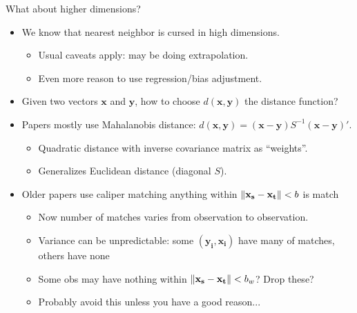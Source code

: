 \documentclass[xcolor=pdftex,dvipsnames,table,mathserif,aspectratio=169]{beamer}
\DeclarePairedDelimiter\norm{\lVert}{\rVert}%
\begin{document}
\begin{frame}{What about higher dimensions?}
\begin{itemize}
\item We know that nearest neighbor is \alert{cursed} in high dimensions.
\begin{itemize}
\item Usual caveats apply: may be doing \alert{extrapolation}.
\item Even more reason to use regression/bias adjustment.
\end{itemize}
\item Given two vectors $\mathbf{x}$ and $\mathbf{y}$, how to choose $d(\mathbf{x},\mathbf{y})$ the \alert{distance} function?
\item Papers mostly use \alert{Mahalanobis distance}: $d(\mathbf{x},\mathbf{y}) = (\mathbf{x}-\mathbf{y}) S^{-1} (\mathbf{x}-\mathbf{y})'$.
\begin{itemize}
\item Quadratic distance with inverse covariance matrix as ``weights''.
\item Generalizes Euclidean distance (diagonal $S$).
\end{itemize}
\item Older papers use \alert{caliper matching} anything within $\norm{\mathbf{x_s} -\mathbf{x_t}}<b$ is match
\begin{itemize}
\item Now number of matches varies from observation to observation.
\item Variance can be unpredictable: some $(\mathbf{y_i},\mathbf{x_i})$ have many of matches, others have none
\item Some obs may have nothing within $\norm{\mathbf{x_s} -\mathbf{x_t}}<b_w$? Drop these?
\item Probably avoid this unless you have a good reason...
\end{itemize}
\end{itemize}
\end{frame}
\end{document}
